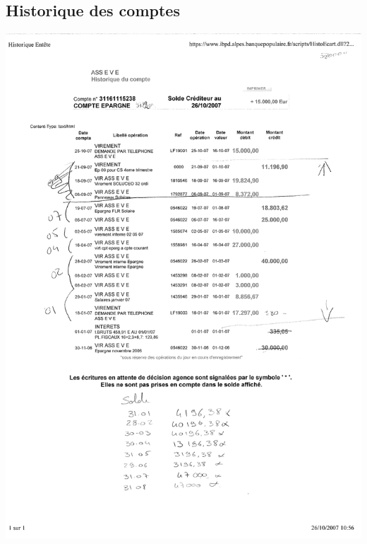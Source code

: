 \subsection{Historique des comptes}
\begin{center}
\includegraphics[scale=0.7]{annexes/images/historique_compte.pdf}
\end{center}
